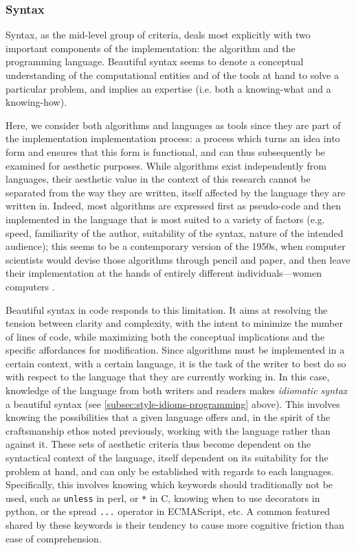 \subsubsection{Syntax}
\label{subsubsec:framework-syntax}

Syntax, as the mid-level group of criteria, deals most explicitly with two important components of the implementation: the algorithm and the programming language. Beautiful syntax seems to denote a conceptual understanding of the computational entities and of the tools at hand to solve a particular problem, and implies an expertise (i.e. both a knowing-what and a knowing-how).

Here, we consider both algorithms and languages as tools since they are part of the implementation implementation process: a process which turns an idea into form and ensures that this form is functional, and can thus subsequently be examined for aesthetic purposes. While algorithms exist independently from languages, their aesthetic value in the context of this research cannot be separated from the way they are written, itself affected by the language they are written in. Indeed, most algorithms are expressed first as pseudo-code and then implemented in the language that is most suited to a variety of factors (e.g. speed, familiarity of the author, suitability of the syntax, nature of the intended audience); this seems to be a contemporary version of the 1950s, when computer scientists would devise those algorithms through pencil and paper, and then leave their implementation at the hands of entirely different individuals—women computers \citep{chun_software_2005}.

Beautiful syntax in code responds to this limitation. It aims at resolving the tension between clarity and complexity, with the intent to minimize the number of lines of code, while maximizing both the conceptual implications and the specific affordances for modification. Since algorithms must be implemented in a certain context, with a certain language, it is the task of the writer to best do so with respect to the language that they are currently working in. In this case, knowledge of the language from both writers and readers makes \emph{idiomatic syntax} a beautiful syntax (see \autoref{subsec:style-idioms-programming} above). This involves knowing the possibilities that a given language offers and, in the spirit of the craftsmanship ethos noted previously, working with the language rather than against it. These sets of aesthetic criteria thus become dependent on the syntactical context of the language, itself dependent on its suitability for the problem at hand, and can only be established with regards to each languages. Specifically, this involves knowing which keywords should traditionally not be used, such as \lstinline{unless} in perl, or \lstinline{*} in C, knowing when to use decorators in python, or the spread \lstinline{...} operator in ECMAScript, etc. A common featured shared by these keywords is their tendency to cause more cognitive friction than ease of comprehension.

